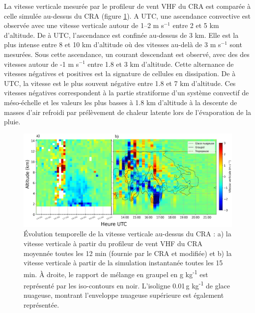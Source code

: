 \documentclass[12pt]{article}
\begin{document}
\begin{multicols}{2}
La vitesse verticale mesurée par le profileur de vent VHF du CRA est comparée à celle simulée au-dessus du CRA (figure \ref{fig:fig3}). A  UTC, une ascendance convective est observée avec une vitesse verticale autour de 1–2 m s$^{-1}$ entre 2 et 5 km d’altitude. De  à  UTC, l’ascendance est confinée au-dessus de 3 km. Elle est la plus intense entre 8 et 10 km d’altitude où des vitesses au-delà de 3 m s$^{-1}$ sont mesurées. Sous cette ascendance, un courant descendant est observé, avec des des vitesses autour de -1 m s$^{-1}$ entre 1.8 et 3 km d’altitude. Cette alternance de vitesses négatives et positives est la signature de cellules en dissipation. De  à  UTC, la vitesse est le plus souvent négative entre 1.8 et 7 km d’altitude. Ces vitesses négatives correspondent à la partie stratiforme d’un système convectif de méso-échelle et les valeurs les plus basses à 1.8 km d’altitude à la descente de masses d’air refroidi par prélèvement de chaleur latente lors de l'évaporation de la pluie. 

\end{multicols}

\begin{figure}[H]
    \centering
    \includegraphics[width=0.9\linewidth]{Figures/CRA_vs_MesoNH.png}
    \caption{Évolution temporelle de la vitesse verticale au-dessus du CRA : a) la vitesse verticale à partir du profileur de vent VHF du CRA moyennée toutes les 12 min (fournie par le CRA et modifiée) et b) la vitesse verticale à partir de la simulation instantanée toutes les 15 min. À droite, le rapport de mélange en graupel en g kg\textsuperscript{-1} est représenté par les iso-contours en noir. L'isoligne 0.01\,g kg\textsuperscript{-1} de glace nuageuse, montrant l'enveloppe nuageuse supérieure est également représentée.}
    \label{fig:fig3}
\end{figure}
\end{document}
